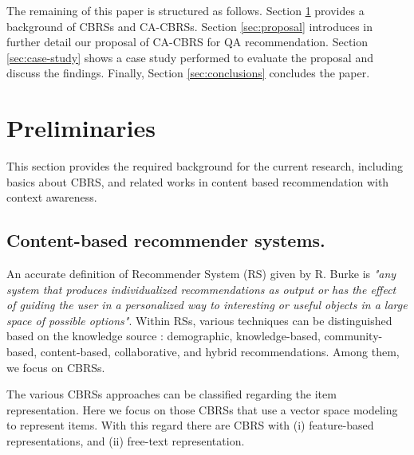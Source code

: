 \documentclass[preprint]{elsarticle}
\begin{document}
\begin{spacing}{1.5}
The remaining of this paper is structured as follows. Section \ref{sec:preliminaries} provides a background of CBRSs and CA-CBRSs. Section \ref{sec:proposal} introduces in further detail our proposal of CA-CBRS for QA recommendation. Section \ref{sec:case-study} shows a case study performed to evaluate the proposal and discuss the findings. Finally, Section \ref{sec:conclusions} concludes the paper.



\section{Preliminaries}
\label{sec:preliminaries}

This section provides the required background for the current research, including basics about CBRS, and related works in content based recommendation with context awareness.

\subsection{Content-based recommender systems.}

An accurate definition of Recommender System (RS) given by R. Burke \cite{Burke2002} is \emph{"any system that produces individualized recommendations as output or has the effect of guiding the user in a personalized way to interesting or useful objects in a large space of possible options"}. Within RSs, various techniques can be distinguished based on the knowledge source \cite{DePessemier2016}: demographic, knowledge-based, community-based, content-based, collaborative, and hybrid recommendations. Among them, we focus on CBRSs.

The various CBRSs approaches can be classified regarding the item representation. Here we focus on those CBRSs that use a vector space modeling to represent items. With this regard there are CBRS with (i) feature-based representations, and (ii) free-text representation.


\end{spacing}
\end{document}
